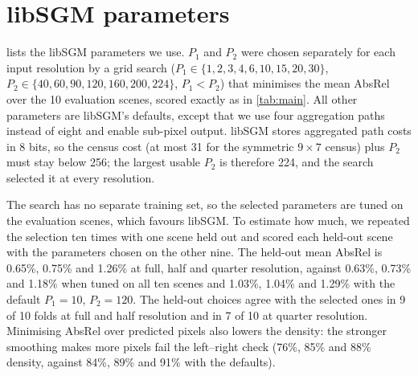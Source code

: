 \documentclass[10pt,twocolumn]{article}
\begin{document}
\clearpage
\section{libSGM parameters}
\label{app:libsgm}
 lists the libSGM parameters we use. $P_1$ and $P_2$ were chosen separately for each
input resolution by a grid search ($P_1\in\{1,2,3,4,6,10,15,20,30\}$, $P_2\in\{40,60,90,120,160,200,224\}$,
$P_1<P_2$) that minimises the mean AbsRel over the 10 evaluation scenes, scored exactly as in
\cref{tab:main}. All other parameters are libSGM's defaults, except that we use four aggregation paths
instead of eight and enable sub-pixel output. libSGM stores aggregated path costs in 8 bits, so the
census cost (at most 31 for the symmetric $9\times7$ census) plus $P_2$ must stay below 256; the
largest usable $P_2$ is therefore 224, and the search selected it at every resolution.

The search has no separate training set, so the selected parameters are tuned on the evaluation
scenes, which favours libSGM. To estimate how much, we repeated the selection ten times with one scene
held out and scored each held-out scene with the parameters chosen on the other nine. The held-out
mean AbsRel is 0.65\%, 0.75\% and 1.26\% at full, half and quarter resolution, against 0.63\%, 0.73\%
and 1.18\% when tuned on all ten scenes and 1.03\%, 1.04\% and 1.29\% with the default $P_1=10$,
$P_2=120$. The held-out choices agree with the selected ones in 9 of 10 folds at full and half
resolution and in 7 of 10 at quarter resolution. Minimising AbsRel over predicted pixels also lowers
the density: the stronger smoothing makes more pixels fail the left--right check (76\%, 85\% and 88\%
density, against 84\%, 89\% and 91\% with the defaults).
\end{document}
